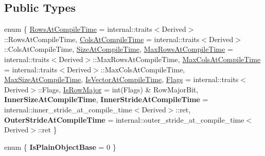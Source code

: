 \subsection*{Public Types}
\begin{DoxyCompactItemize}
\item 
enum \{ \newline
\mbox{\hyperlink{class_eigen_1_1_dense_base_a86241c772c74c04eeeb0480b99c5ab77adb37c78ebbf15aa20b65c3b70415a1ab}{Rows\+At\+Compile\+Time}} = internal\+::traits$<$Derived$>$\+::Rows\+At\+Compile\+Time, 
\mbox{\hyperlink{class_eigen_1_1_dense_base_a86241c772c74c04eeeb0480b99c5ab77a787f85fd67ee5985917eb2cef6e70441}{Cols\+At\+Compile\+Time}} = internal\+::traits$<$Derived$>$\+::Cols\+At\+Compile\+Time, 
\mbox{\hyperlink{class_eigen_1_1_dense_base_a86241c772c74c04eeeb0480b99c5ab77a25cb495affdbd796198462b8ef06be91}{Size\+At\+Compile\+Time}}, 
\mbox{\hyperlink{class_eigen_1_1_dense_base_a86241c772c74c04eeeb0480b99c5ab77ad2baadea085372837b0e80dc93be1306}{Max\+Rows\+At\+Compile\+Time}} = internal\+::traits$<$Derived$>$\+::Max\+Rows\+At\+Compile\+Time, 
\newline
\mbox{\hyperlink{class_eigen_1_1_dense_base_a86241c772c74c04eeeb0480b99c5ab77acc3a41000cf1d29dd1a320b2a09d2a65}{Max\+Cols\+At\+Compile\+Time}} = internal\+::traits$<$Derived$>$\+::Max\+Cols\+At\+Compile\+Time, 
\mbox{\hyperlink{class_eigen_1_1_dense_base_a86241c772c74c04eeeb0480b99c5ab77a3a459062d39cb34452518f5f201161d2}{Max\+Size\+At\+Compile\+Time}}, 
\mbox{\hyperlink{class_eigen_1_1_dense_base_a86241c772c74c04eeeb0480b99c5ab77a1156955c8099c5072934b74c72654ed0}{Is\+Vector\+At\+Compile\+Time}}, 
\mbox{\hyperlink{class_eigen_1_1_dense_base_a86241c772c74c04eeeb0480b99c5ab77a7392c9b2ad41ba3c16fdc5306c04d581}{Flags}} = internal\+::traits$<$Derived$>$\+::Flags, 
\newline
\mbox{\hyperlink{class_eigen_1_1_dense_base_a86241c772c74c04eeeb0480b99c5ab77a406b6af91d61d348ba1c9764bdd66008}{Is\+Row\+Major}} = int(Flags) \& Row\+Major\+Bit, 
{\bfseries Inner\+Size\+At\+Compile\+Time}, 
{\bfseries Inner\+Stride\+At\+Compile\+Time} = internal\+::inner\+\_\+stride\+\_\+at\+\_\+compile\+\_\+time$<$Derived$>$\+::ret, 
{\bfseries Outer\+Stride\+At\+Compile\+Time} = internal\+::outer\+\_\+stride\+\_\+at\+\_\+compile\+\_\+time$<$Derived$>$\+::ret
 \}
\item 
\mbox{\label{class_eigen_1_1_dense_base_aee308dc4ace71b358e1958c2bdfcbf50}} 
enum \{ {\bfseries Is\+Plain\+Object\+Base} = 0
 \}
\item 

\end{DoxyCompactItemize}
